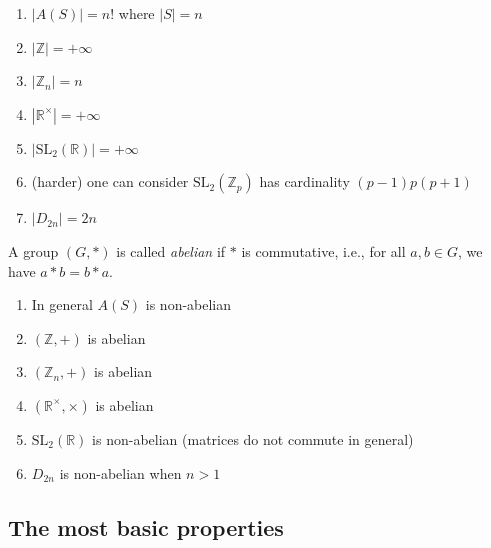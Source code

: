 \begin{example}
	\begin{enumerate}
\item $|A(S)| = n!$ where $|S| = n$
\item $|\mathbb{Z}| = +\infty $
\item $|\mathbb{Z}_n| = n$
\item $|\mathbb{R}^\times | = +\infty $
\item $\left| \text{SL}_2(\mathbb{R}) \right| = +\infty $ 
\item (harder) one can consider $\text{SL}_2 \left( \mathbb{Z}_p \right) $ has cardinality $(p -1) p (p +1)$
\item $|D_{2n}| = 2n$
	\end{enumerate}
\end{example}

\begin{definition}
	A group $(G, *)$ is called \textit{abelian} if $*$ is commutative, i.e.,  for all $a,b \in G$, we have $a*b = b*a$.
\end{definition}
\begin{example}
	\begin{enumerate}
		\item In general $A(S)$ is non-abelian
		\item $(\mathbb{Z},+)$ is abelian
		\item $(\mathbb{Z}_n,+)$ is abelian
		\item $\left( \mathbb{R}^\times  ,\times  \right) $ is abelian
		\item $\text{SL}_2 (\mathbb{R}) $ is non-abelian (matrices do not commute in general)
		\item $D_{2n}$ is non-abelian when $n>1$
	\end{enumerate}
\end{example}

\subsection{The most basic properties}


